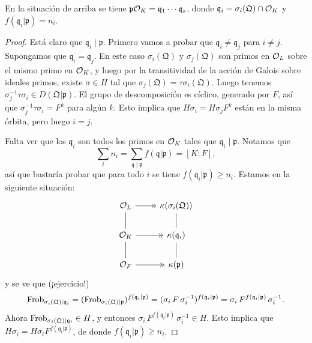 \begin{teorema}
  En la situación de arriba se tiene
  $\mathfrak{p} \mathcal{O}_K = \mathfrak{q}_1\cdots \mathfrak{q}_s$, donde
  $\mathfrak{q}_i = \sigma_i (\mathfrak{Q}) \cap \mathcal{O}_K$ y
  $f (\mathfrak{q}_i|\mathfrak{p}) = n_i$.

  \begin{proof}
    Está claro que $\mathfrak{q}_i \mid \mathfrak{p}$. Primero vamos a probar
    que $\mathfrak{q}_i \ne \mathfrak{q}_j$ para $i \ne j$. Supongamos que
    $\mathfrak{q}_i = \mathfrak{q}_j$. En este caso
    $\sigma_i (\mathfrak{Q})$ y $\sigma_j (\mathfrak{Q})$ son primos en $\mathcal{O}_L$
    sobre el mismo primo en $\mathcal{O}_K$, y luego por la transitividad de la acción
    de Galois sobre ideales primos, existe $\sigma \in H$ tal que
    $\sigma_j (\mathfrak{Q}) = \tau \sigma_i (\mathfrak{Q})$. Luego tenemos
    $\sigma_j^{-1} \tau \sigma_i \in D (\mathfrak{Q}|\mathfrak{p})$.
    El grupo de descomposición es cíclico, generado por $F$, así que
    $\sigma_j^{-1} \tau \sigma_i = F^k$ para algún $k$. Esto implica que
    $H \sigma_i = H \sigma_j F^k$ están en la misma órbita, pero luego
    $i = j$.

    Falta ver que los $\mathfrak{q}_i$ son todos los primos en $\mathcal{O}_K$ tales que
    $\mathfrak{q}_i \mid \mathfrak{p}$. Notamos que
    $$\sum_i n_i = \sum_{\mathfrak{q}\mid\mathfrak{p}} f (\mathfrak{q}|\mathfrak{p}) = [K:F],$$
    así que bastaría probar que para todo $i$ se tiene
    $f (\mathfrak{q}_i|\mathfrak{p}) \ge n_i$.
    Estamos en la siguiente situación:
    \[ \begin{tikzcd}
      \O_L \ar[-]{d}\ar[->>]{r} & \kappa (\sigma_i (\mathfrak{Q}))\ar[-]{d} \\
      \O_K \ar[-]{d}\ar[->>]{r} & \kappa (\mathfrak{q}_i)\ar[-]{d} \\
      \O_F \ar[->>]{r} & \kappa (\mathfrak{p})
    \end{tikzcd} \]
    y se ve que (¡ejercicio!)
    \[ \operatorname{Frob}_{\sigma_i (\mathfrak{Q}) | \mathfrak{q}_i} =
       (\operatorname{Frob}_{\sigma_i (\mathfrak{Q}) | \mathfrak{p}})^{f (\mathfrak{q}_i|\mathfrak{p})} =
       (\sigma_i\,F\,\sigma_i^{-1})^{f (\mathfrak{q}_i|\mathfrak{p})} =
       \sigma_i\,F^{f (\mathfrak{q}_i|\mathfrak{p})}\,\sigma_i^{-1}. \]
    Ahora $\operatorname{Frob}_{\sigma_i (\mathfrak{Q}) | \mathfrak{q}_i} \in H$, y entonces
    $\sigma_i\,F^{f (\mathfrak{q}_i|\mathfrak{p})}\,\sigma_i^{-1} \in H$.
    Esto implica que
    $H \sigma_i = H \sigma_i F^{f (\mathfrak{q}_i|\mathfrak{p})}$,
    de donde $f (\mathfrak{q}_i|\mathfrak{p}) \ge n_i$.
  \end{proof}
\end{teorema}


